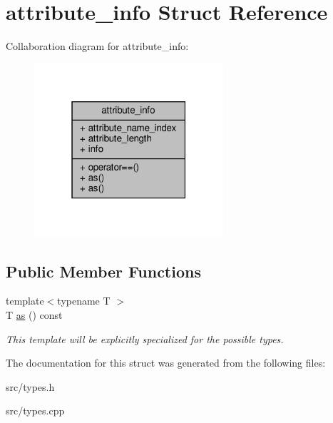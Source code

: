 \hypertarget{structattribute__info}{}\section{attribute\+\_\+info Struct Reference}
\label{structattribute__info}


Collaboration diagram for attribute\+\_\+info\+:\nopagebreak
\begin{figure}[H]
\begin{center}
\leavevmode
\includegraphics[width=199pt]{structattribute__info__coll__graph}
\end{center}
\end{figure}
\subsection*{Public Member Functions}
\begin{DoxyCompactItemize}
\item 
\mbox{\label{structattribute__info_ace33b133435450d7d161751a3393de11}} 
{\footnotesize template$<$typename T $>$ }\\T \hyperlink{structattribute__info_ace33b133435450d7d161751a3393de11}{as} () const
\begin{DoxyCompactList}\small\item\em This template will be explicitly specialized for the possible types. \end{DoxyCompactList}\end{DoxyCompactItemize}


The documentation for this struct was generated from the following files\+:\begin{DoxyCompactItemize}
\item 
src/types.\+h\item 
src/types.\+cpp\end{DoxyCompactItemize}
